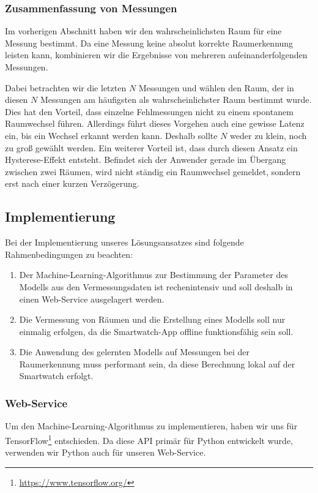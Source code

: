 \subsubsection{Zusammenfassung von Messungen}
\label{sec:lok-zusammenfassung-messungen}

Im vorherigen Abschnitt haben wir den wahrscheinlichsten Raum für eine Messung bestimmt.
Da eine Messung keine absolut korrekte Raumerkennung leisten kann, kombinieren wir
die Ergebnisse von mehreren aufeinanderfolgenden Messungen.

Dabei betrachten wir die letzten $N$ Messungen und wählen den Raum, der in diesen
$N$ Messungen am häufigsten als wahrscheinlichster Raum bestimmt wurde.
Dies hat den Vorteil, dass einzelne Fehlmessungen nicht zu einem spontanem Raumwechsel
führen. Allerdings führt dieses Vorgehen auch eine gewisse Latenz ein, bis ein Wechsel
erkannt werden kann. Deshalb sollte $N$ weder zu klein, noch zu groß gewählt werden.
Ein weiterer Vorteil ist, dass durch diesen Ansatz ein Hysterese-Effekt entsteht.
Befindet sich der Anwender gerade im Übergang zwischen zwei Räumen, wird nicht ständig
ein Raumwechsel gemeldet, sondern erst nach einer kurzen Verzögerung.
  
\subsection{Implementierung}

Bei der Implementierung unseres Lösungsansatzes sind folgende Rahmenbedingungen zu beachten:
\begin{enumerate}
	\item Der Machine-Learning-Algorithmus zur Bestimmung der Parameter des Modells aus
		den Vermessungsdaten ist rechenintensiv und soll deshalb in einen Web-Service
		ausgelagert werden.
	\item Die Vermessung von Räumen und die Erstellung eines Modells soll nur einmalig
		erfolgen, da die Smartwatch-App offline funktionsfähig sein soll.
	\item Die Anwendung des gelernten Modells auf Messungen bei der Raumerkennung muss
		performant sein, da diese Berechnung lokal auf der Smartwatch erfolgt.
\end{enumerate}

\subsubsection{Web-Service}

Um den Machine-Learning-Algorithmus zu implementieren, haben wir uns für
TensorFlow\footnote{\url{https://www.tensorflow.org/}} entschieden.
Da diese API primär für Python entwickelt wurde, verwenden wir Python auch
für unseren Web-Service.

